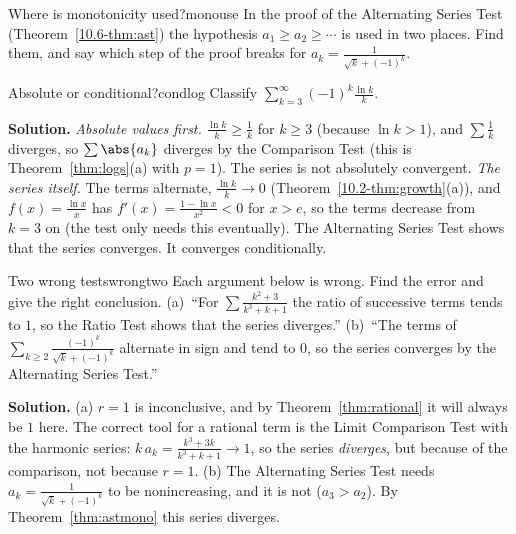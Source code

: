 \documentclass[11pt]{article}
\begin{document}
\begin{think}{Where is monotonicity used?}{monouse}
In the proof of the Alternating Series Test (Theorem~\ref{10.6-thm:ast}) the hypothesis $a_1\ge a_2\ge\cdots$ is used in two places. Find them, and say which step of the proof breaks for $a_k=\frac1{\sqrt k+(-1)^k}$.
\end{think}

\begin{exmp}{Absolute or conditional?}{condlog}
Classify $\displaystyle\sum_{k=3}^\infty(-1)^k\frac{\ln k}k$.

\textbf{Solution.} \emph{Absolute values first.} $\frac{\ln k}k\ge\frac1k$ for $k\ge3$ (because $\ln k>1$), and $\sum\frac1k$ diverges, so $\sum\abs{a_k}$ diverges by the Comparison Test (this is Theorem~\ref{thm:logs}(a) with $p=1$). The series is not absolutely convergent. \emph{The series itself.} The terms alternate, $\frac{\ln k}k\to0$ (Theorem~\ref{10.2-thm:growth}(a)), and $f(x)=\frac{\ln x}x$ has $f'(x)=\frac{1-\ln x}{x^2}<0$ for $x>e$, so the terms decrease from $k=3$ on (the test only needs this eventually). The Alternating Series Test shows that the series converges. It converges conditionally.
\end{exmp}

\begin{exmp}{Two wrong tests}{wrongtwo}
Each argument below is wrong. Find the error and give the right conclusion. (a)~``For $\sum\frac{k^2+3}{k^3+k+1}$ the ratio of successive terms tends to $1$, so the Ratio Test shows that the series diverges.'' (b)~``The terms of $\sum_{k\ge2}\frac{(-1)^k}{\sqrt k+(-1)^k}$ alternate in sign and tend to $0$, so the series converges by the Alternating Series Test.''

\textbf{Solution.} (a) $r=1$ is inconclusive, and by Theorem~\ref{thm:rational} it will always be $1$ here. The correct tool for a rational term is the Limit Comparison Test with the harmonic series: $k\,a_k=\frac{k^3+3k}{k^3+k+1}\to1$, so the series \emph{diverges}, but because of the comparison, not because $r=1$. (b) The Alternating Series Test needs $a_k=\frac1{\sqrt k+(-1)^k}$ to be nonincreasing, and it is not ($a_3>a_2$). By Theorem~\ref{thm:astmono} this series diverges.
\end{exmp}
\end{document}
